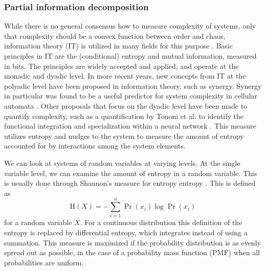 \documentclass[../main.tex]{subfiles}
\begin{document}
\subsubsection{Partial information decomposition}

While there is no general consensus how to measure complexity of systems, only that complexity should be a convex function between order and chaos, information theory (IT) is utilized in many fields for this purpose \cite{bar2013computationally, williams2010nonnegative}. %
Basic principles in IT are the (conditional) entropy and mutual information, measured in bits.
The principles are widely accepted and applied, and operate at the monadic and dyadic level.
In more recent years, new concepts from IT at the polyadic level have been proposed in information theory, such as synergy.
Synergy in particular was found to be a useful predictor for system complexity in cellular automata \cite{9999QuaxChli}.
Other proposals that focus on the dyadic level have been made to quantify complexity, such as a quantification by Tononi et al. to identify the functional integration and specialization within a neural network \cite{tononi1999measures}.
This measure utilizes entropy and nudges to the system to measure the amount of entropy accounted for by interactions among the system elements.


We can look at systems of random variables at varying levels.
At the single variable level, we can examine the amount of entropy in a random variable.
This is usually done through Shannon's measure for entropy entropy \cite{shannon1949mathematical}.
This is defined as
%
\begin{equation}
\mathrm{H}\left( X \right) = -\sum^n_{i=1} \Pr \left( x_i \right ) \log \Pr \left( x_i \right)
\end{equation}
%
for a random variable $X$.
For a continuous distribution this definition of the entropy is replaced by differential entropy, which integrates instead of using a summation.
This measure is maximized if the probability distribution is as evenly spread out as possible, in the case of a probability mass function (PMF) when all probabilities are uniform.
\end{document}
